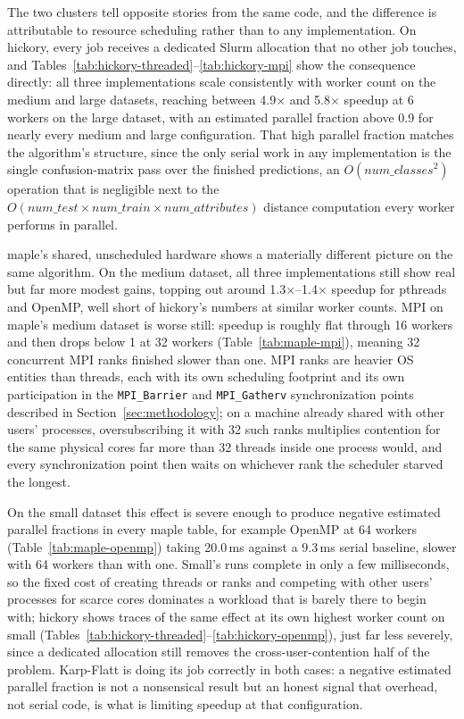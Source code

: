 \documentclass[conference]{IEEEtran}
\begin{document}
The two clusters tell opposite stories from the same code, and the
difference is attributable to resource scheduling rather than to any
implementation. On hickory, every job receives a dedicated Slurm
allocation that no other job touches, and
Tables~\ref{tab:hickory-threaded}--\ref{tab:hickory-mpi} show the
consequence directly: all three
implementations scale consistently with worker count on the medium and
large datasets, reaching between 4.9$\times$ and 5.8$\times$ speedup at 6
workers on the large dataset, with an estimated parallel fraction above
0.9 for nearly every medium and large configuration. That high parallel
fraction matches the algorithm's structure, since the only serial work in
any implementation is the single confusion-matrix pass over the finished
predictions, an $O(\mathit{num\_classes}^2)$ operation that is negligible
next to the $O(\mathit{num\_test} \times \mathit{num\_train} \times
\mathit{num\_attributes})$ distance computation every worker performs in
parallel.

maple's shared, unscheduled hardware shows a materially different picture
on the same algorithm. On the medium dataset, all three implementations
still show real but far more modest gains, topping out around
1.3$\times$--1.4$\times$ speedup for pthreads and OpenMP, well short of
hickory's numbers at similar worker counts. MPI on maple's medium dataset
is worse still: speedup is roughly flat through 16 workers and then drops
below 1 at 32 workers (Table~\ref{tab:maple-mpi}), meaning 32 concurrent
MPI ranks finished slower than one. MPI ranks are heavier OS entities than
threads, each with its own scheduling footprint and its own participation
in the \texttt{MPI\_Barrier} and \texttt{MPI\_Gatherv} synchronization
points described in Section~\ref{sec:methodology}; on a machine already
shared with other users' processes, oversubscribing it with 32 such ranks
multiplies contention for the same physical cores far more than 32 threads
inside one process would, and every synchronization point then waits on
whichever rank the scheduler starved the longest.

On the small dataset this effect is severe enough to produce negative
estimated parallel fractions in every maple table, for example OpenMP at
64 workers (Table~\ref{tab:maple-openmp}) taking 20.0\,ms against a 9.3\,ms
serial baseline, slower with 64 workers than with one. Small's runs
complete in only a few milliseconds, so the fixed cost of creating threads
or ranks and competing with other users' processes for scarce cores
dominates a workload that is barely there to begin with; hickory shows
traces of the same effect at its own highest worker count on small
(Tables~\ref{tab:hickory-threaded}--\ref{tab:hickory-openmp}), just far
less severely, since a dedicated allocation still removes the
cross-user-contention half of the problem. Karp-Flatt is doing its job
correctly in both cases: a negative estimated parallel fraction is not a
nonsensical result but an honest signal that overhead, not serial code,
is what is limiting speedup at that configuration.
\end{document}
